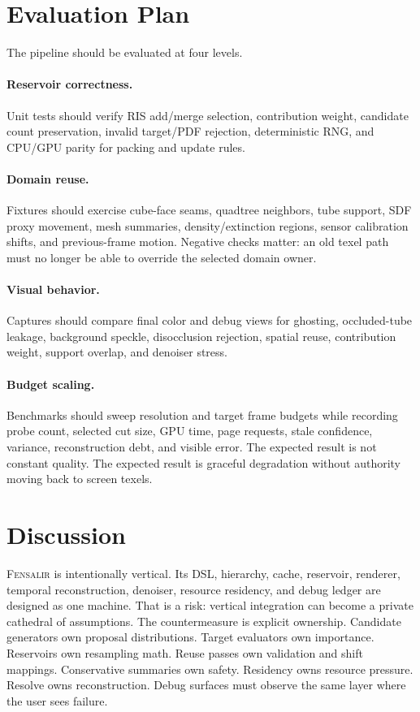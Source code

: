 \documentclass[11pt]{article}
\newcommand{\Fensalir}{\textsc{Fensalir}}
\begin{document}
\section{Evaluation Plan}

The pipeline should be evaluated at four levels.

\paragraph{Reservoir correctness.}
Unit tests should verify RIS add/merge selection, contribution weight,
candidate count preservation, invalid target/PDF rejection, deterministic RNG,
and CPU/GPU parity for packing and update rules.

\paragraph{Domain reuse.}
Fixtures should exercise cube-face seams, quadtree neighbors, tube support,
SDF proxy movement, mesh summaries, density/extinction regions, sensor
calibration shifts, and previous-frame motion.  Negative checks matter: an old
texel path must no longer be able to override the selected domain owner.

\paragraph{Visual behavior.}
Captures should compare final color and debug views for ghosting, occluded-tube
leakage, background speckle, disocclusion rejection, spatial reuse, contribution
weight, support overlap, and denoiser stress.

\paragraph{Budget scaling.}
Benchmarks should sweep resolution and target frame budgets while recording
probe count, selected cut size, GPU time, page requests, stale confidence,
variance, reconstruction debt, and visible error.  The expected result is not
constant quality.  The expected result is graceful degradation without authority
moving back to screen texels.

\section{Discussion}

\Fensalir{} is intentionally vertical.  Its DSL, hierarchy, cache, reservoir,
renderer, temporal reconstruction, denoiser, resource residency, and debug
ledger are designed as one machine.  That is a risk: vertical integration can
become a private cathedral of assumptions.  The countermeasure is explicit
ownership.  Candidate generators own proposal distributions.  Target evaluators
own importance.  Reservoirs own resampling math.  Reuse passes own validation
and shift mappings.  Conservative summaries own safety.  Residency owns
resource pressure.  Resolve owns reconstruction.  Debug surfaces must observe
the same layer where the user sees failure.
\end{document}
